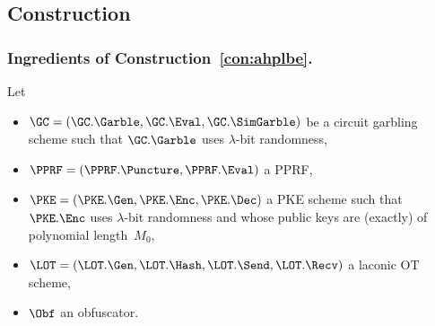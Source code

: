 \subsection{Construction}\label{sec:ahplbe-construction}

\subsubsection{Ingredients of Construction~\ref{con:ahplbe}.}
Let
\begin{itemize}
\item $\GC=(\GC.\Garble,\GC.\Eval,\GC.\SimGarble)$ be a circuit garbling scheme
such that $\GC.\Garble$ uses $\lambda$-bit randomness,
\item $\PPRF=(\PPRF.\Puncture,\PPRF.\Eval)$ a PPRF,
\item $\PKE=(\PKE.\Gen,\PKE.\Enc,\PKE.\Dec)$ a PKE scheme
such that $\PKE.\Enc$ uses $\lambda$-bit randomness and
whose public keys are (exactly) of polynomial length~$M_0$,
\item $\LOT=(\LOT.\Gen,\LOT.\Hash,\LOT.\Send,\LOT.\Recv)$ a laconic OT scheme,
\item $\Obf$ an obfuscator.
\end{itemize}

\begin{figure}

\end{figure}

